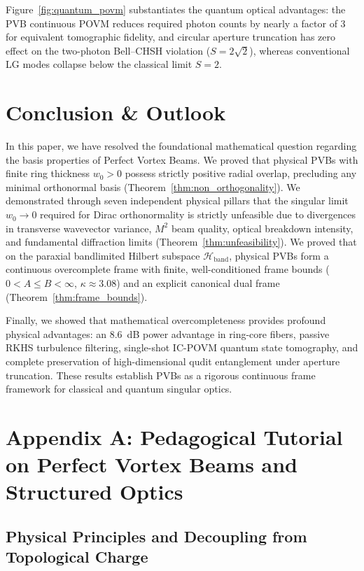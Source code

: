 \documentclass{optica-article}
\begin{document}
Figure~\ref{fig:quantum_povm} substantiates the quantum optical advantages: the PVB continuous POVM reduces required photon counts by nearly a factor of 3 for equivalent tomographic fidelity, and circular aperture truncation has zero effect on the two-photon Bell--CHSH violation ($S = 2\sqrt{2}$), whereas conventional LG modes collapse below the classical limit $S = 2$.

\section{Conclusion \& Outlook}
\label{sec:conclusion}

In this paper, we have resolved the foundational mathematical question regarding the basis properties of Perfect Vortex Beams. We proved that physical PVBs with finite ring thickness $w_0 > 0$ possess strictly positive radial overlap, precluding any minimal orthonormal basis (Theorem~\ref{thm:non_orthogonality}). We demonstrated through seven independent physical pillars that the singular limit $w_0 \to 0$ required for Dirac orthonormality is strictly unfeasible due to divergences in transverse wavevector variance, $M^2$ beam quality, optical breakdown intensity, and fundamental diffraction limits (Theorem~\ref{thm:unfeasibility}). We proved that on the paraxial bandlimited Hilbert subspace $\mathcal{H}_{\text{band}}$, physical PVBs form a continuous overcomplete frame with finite, well-conditioned frame bounds ($0 < A \le B < \infty$, $\kappa \approx 3.08$) and an explicit canonical dual frame (Theorem~\ref{thm:frame_bounds}).

Finally, we showed that mathematical overcompleteness provides profound physical advantages: an 8.6~dB power advantage in ring-core fibers, passive RKHS turbulence filtering, single-shot IC-POVM quantum state tomography, and complete preservation of high-dimensional qudit entanglement under aperture truncation. These results establish PVBs as a rigorous continuous frame framework for classical and quantum singular optics.

\appendix

\section{Appendix A: Pedagogical Tutorial on Perfect Vortex Beams and Structured Optics}
\label{app:primer}

\subsection{Physical Principles and Decoupling from Topological Charge}
\end{document}
